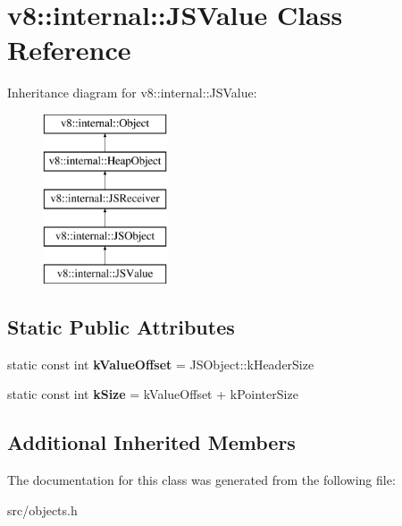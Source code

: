 \hypertarget{classv8_1_1internal_1_1_j_s_value}{}\section{v8\+:\+:internal\+:\+:J\+S\+Value Class Reference}
\label{classv8_1_1internal_1_1_j_s_value}
Inheritance diagram for v8\+:\+:internal\+:\+:J\+S\+Value\+:\begin{figure}[H]
\begin{center}
\leavevmode
\includegraphics[height=5.000000cm]{classv8_1_1internal_1_1_j_s_value}
\end{center}
\end{figure}
\subsection*{Static Public Attributes}
\begin{DoxyCompactItemize}
\item 
\hypertarget{classv8_1_1internal_1_1_j_s_value_a2d01c7fffbb992f02238702dff7d5b8f}{}static const int {\bfseries k\+Value\+Offset} = J\+S\+Object\+::k\+Header\+Size\label{classv8_1_1internal_1_1_j_s_value_a2d01c7fffbb992f02238702dff7d5b8f}

\item 
\hypertarget{classv8_1_1internal_1_1_j_s_value_a8f0fedf075454bcd7cb54bd598ffde91}{}static const int {\bfseries k\+Size} = k\+Value\+Offset + k\+Pointer\+Size\label{classv8_1_1internal_1_1_j_s_value_a8f0fedf075454bcd7cb54bd598ffde91}

\end{DoxyCompactItemize}
\subsection*{Additional Inherited Members}


The documentation for this class was generated from the following file\+:\begin{DoxyCompactItemize}
\item 
src/objects.\+h\end{DoxyCompactItemize}
